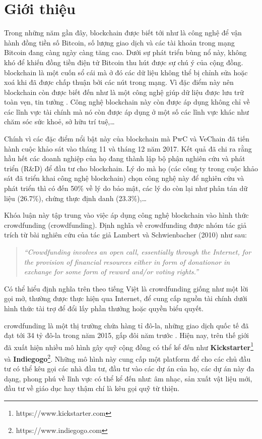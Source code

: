 \documentclass[../main-report.tex]{subfiles}
\begin{document}
\section{Giới thiệu}
Trong những năm gần đây, \Gls{blockchain} được biết tới như là công nghệ để vận hành đồng tiền số Bitcoin, số lượng giao dịch và các tài khoản trong mạng Bitcoin đang càng ngày càng tăng cao. Dưới sự phát triển bùng nổ này, không khó để khiến đồng tiền điện tử Bitcoin thu hút được sự chú ý của cộng đồng. \Gls{blockchain} là một cuốn sổ cái mà ở đó các dữ liệu không thể bị chỉnh sửa hoặc xoá khi đã được chấp thuận bởi các nút trong mạng. Vì đặc điểm này nên \gls{blockchain} còn được biết đến như là một công nghệ giúp dữ liệu được lưu trữ toàn vẹn, tin tưởng \cite{yli2016current}. Công nghệ \gls{blockchain} này còn được áp dụng không chỉ về các lĩnh vực tài chính mà nó còn được áp dụng ở một số các lĩnh vực khác như chăm sóc sức khoẻ, sở hữu trí tuệ,\ldots

Chính vì các đặc điểm nổi bật này của \gls{blockchain} mà PwC và VeChain đã tiến hành cuộc khảo sát vào tháng 11 và tháng 12 năm 2017. Kết quả đã chi ra rằng hầu hết các doanh nghiệp của họ đang thành lập bộ phận nghiên cứu và phát triển (R\&D) để đầu tư cho \gls{blockchain}. Lý do mà họ (các công ty trong cuộc khảo sát đã triển khai công nghệ \gls{blockchain}) chọn công nghệ này để nghiên cứu và phát triển thì có đến 50\% về lý do bảo mật, các lý do còn lại như phân tán dữ liệu (26.7\%), chứng thực định danh (23.3\%),\ldots

Khóa luận này tập trung vào việc áp dụng công nghệ \gls{blockchain} vào hình thức \Glsdesc{crowdfunding} (\Gls{crowdfunding}). Định nghĩa về \gls{crowdfunding} được nhóm tác giả trích từ bài nghiên cứu của tác giả Lambert và Schwienbacher (2010) như sau:

\begin{quote}
\textit{``Crowdfunding  involves  an  open  call,  essentially  through  the Internet, for the provision of financial resources either in form of donationor in exchange for some form of reward and/or voting rights.''} \cite{belleflamme2010crowdfunding}
\end{quote}

Có thể hiểu định nghĩa trên theo tiếng Việt là \gls{crowdfunding} giống như một lời gọi mở, thường được thực hiện qua Internet, để cung cấp nguồn tài chính dưới hình thức tài trợ để đổi lấy phần thưởng hoặc quyền biểu quyết.

\Gls{crowdfunding} là một thị trường chứa hàng tỉ đô-la, những giao dịch quốc tế đã đạt tới 34 tỷ đô-la trong năm 2015, gấp đôi năm trước \cite{hornuf2018economics}. Hiện nay, trên thế giới đã xuất hiện nhiều mô hình gây quỹ cộng đồng có thể kể đến như \textbf{Kickstarter}\footnote{https://www.kickstarter.com} và \textbf{Indiegogo}\footnote{https://www.indiegogo.com}. Những mô hình này cung cấp một platform để cho các chủ đầu tư có thể kêu gọi các nhà đầu tư, đầu tư vào các dự án của họ, các dự án này đa dạng, phong phú về lĩnh vực có thể kể đến như: âm nhạc, sản xuất vật liệu mới, đầu tư về giáo dục hay thậm chí là kêu gọi quỹ từ thiện.
\end{document}
